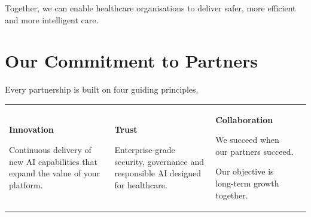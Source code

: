 Together, we can enable healthcare organisations to deliver safer, more efficient and more intelligent care.


\section{Our Commitment to Partners}

Every partnership is built on four guiding principles.

\vspace{5mm}

\begin{center}

\begin{tabularx}{\textwidth}{XXXX}

\begin{partnerbox}

\centering

{\Large\textbf{Innovation}}

\vspace{2mm}

Continuous delivery of new AI capabilities that expand the value of your platform.

\end{partnerbox}

&

\begin{partnerbox}

\centering

{\Large\textbf{Trust}}

\vspace{2mm}

Enterprise-grade security, governance and responsible AI designed for healthcare.

\end{partnerbox}

&

\begin{partnerbox}

\centering

{\Large\textbf{Collaboration}}

\vspace{2mm}

We succeed when our partners succeed.

Our objective is long-term growth together.

\end{partnerbox}


\end{tabularx}
\end{center}
